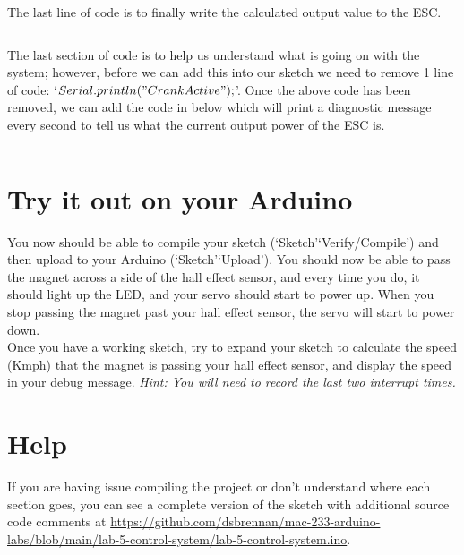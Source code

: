 \documentclass[11pt,a4paper]{article}
\begin{document}
\noindent
The last line of code is to finally write the calculated output value to the ESC.\\
\vspace{-1.75em}
\inputminted{arduino}{./src/5-esc-power.txt}
\vspace{.75em}

\noindent
The last section of code is to help us understand what is going on with the system; however, before we can add this into our sketch we need to remove 1 line of code: `$Serial.println("Crank Active");$'. Once the above code has been removed, we can add the code in below which will print a diagnostic message every second to tell us what the current output power of the ESC is.\\
\vspace{-1.75em}
\inputminted{arduino}{./src/6-message.txt}
\vspace{-1em}

\section*{Try it out on your Arduino}
You now should be able to compile your sketch (`Sketch'\textrightarrow `Verify/Compile') and then upload to your Arduino (`Sketch'\textrightarrow `Upload'). You should now be able to pass the magnet across a side of the hall effect sensor, and every time you do, it should light up the LED, and your servo should start to power up. When you stop passing the magnet past your hall effect sensor, the servo will start to power down.\\

\noindent
Once you have a working sketch, try to expand your sketch to calculate the speed (Kmph) that the magnet is passing your hall effect sensor, and display the speed in your debug message. \textit{Hint: You will need to record the last two interrupt times.}

\pagebreak
\section*{Help}
If you are having issue compiling the project or don't understand where each section goes, you can see a complete version of the sketch with additional source code comments at \url{https://github.com/dsbrennan/mac-233-arduino-labs/blob/main/lab-5-control-system/lab-5-control-system.ino}.

\begin{center}
\end{center}
\end{document}
